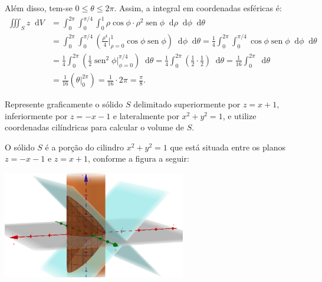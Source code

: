 \documentclass[12pt,a4paper]{article}
\newcommand*\diff{\mathop{}\!\mathrm{d}}
\newcommand*\sen{\operatorname{sen}}
\begin{document}
\begin{ExerciseList}
Além disso, tem-se $0 \leq \theta \leq 2\pi$. Assim, a integral em coordenadas esféricas é:
\begin{align*}
  \iiint_{S} z \diff{V}
  & = \int_0^{2\pi} \int_0^{\pi/4} \int_0^1 \rho \cos \phi \cdot \rho^2 \sen \phi\diff{\rho}\diff{\phi}\diff{\theta} \\
  & = \int_0^{2\pi} \int_0^{\pi/4} \left( \frac{\rho^4}{4} \bigg|_{\rho=0}^1 \cos \phi \sen \phi \right) \diff{\phi}\diff{\theta}
    = \frac{1}{4} \int_0^{2\pi} \int_0^{\pi/4} \cos \phi \sen \phi\diff{\phi}\diff{\theta} \\
  & = \frac{1}{4} \int_0^{2\pi} \left( \frac{1}{2} \sen^2 \phi \bigg|_{\phi=0}^{\pi/4} \right) \diff{\theta}
  = \frac{1}{4} \int_0^{2\pi} \left( \frac{1}{2} \cdot \frac{1}{2} \right) \diff{\theta}
  = \frac{1}{16} \int_0^{2\pi} \diff{\theta} \\
  &
  = \frac{1}{16} \left( \theta \bigg|_0^{2\pi} \right)
  = \frac{1}{16} \cdot 2\pi
  = \frac{\pi}{8}.
\end{align*}

\newpage

\Exercise[title={2,0}] Represente graficamente o sólido $S$ delimitado superiormente por $z = x + 1$, inferiormente por $z = - x - 1$ e lateralmente por $x^2 + y^2 = 1$, e utilize coordenadas cilíndricas para calcular o volume de $S$.

\Answer O sólido $S$ é a porção do cilindro $x^2 + y^2 = 1$ que está situada entre os planos $z = - x - 1$ e $z = x + 1$, conforme a figura a seguir:

\begin{center}
  \includegraphics[width=8.0cm]{img/prova-3-nex-cilindro-e-planos.png}
\end{center}


\end{ExerciseList}
\end{document}
